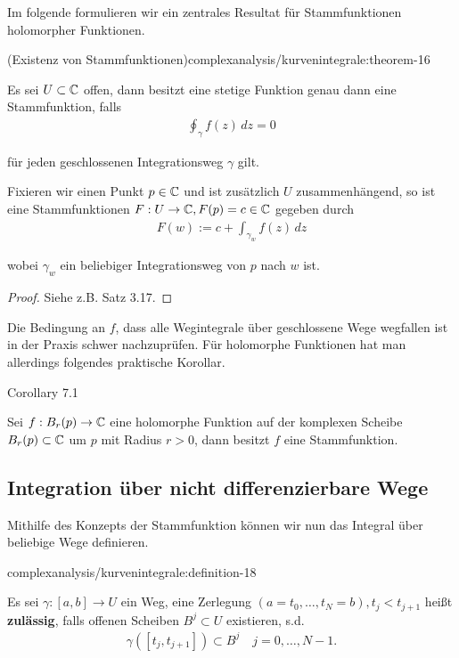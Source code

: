 \par
Im folgende formulieren wir ein zentrales Resultat für Stammfunktionen holomorpher Funktionen.
\begin{theorem}{(Existenz von Stammfunktionen)}{complexanalysis/kurvenintegrale:theorem-16}



\par
Es sei \(U\subset\mathbb{C}\) offen, dann besitzt eine stetige Funktion genau dann eine Stammfunktion, falls
\begin{align*}
\oint_\gamma f(z)\, dz =0
\end{align*}
\par
für jeden geschlossenen Integrationsweg \(\gamma\) gilt.

\par
Fixieren wir einen Punkt \(p\in\mathbb{C}\) und ist zusätzlich \(U\) zusammenhängend, so ist eine Stammfunktionen \(F:U\to\mathbb{C}, F(p)=c\in\mathbb{C}\) gegeben durch
\begin{align*}
F(w):= c+ \int_{\gamma_w} f(z) \,dz
\end{align*}
\par
wobei \(\gamma_w\) ein beliebiger Integrationsweg von \(p\) nach \(w\) ist.
\end{theorem}

\begin{proof}
 Siehe z.B. \cite{Nee17} Satz 3.17.
\end{proof}

\par
Die Bedingung an \(f\), dass alle Wegintegrale über geschlossene Wege wegfallen ist in der Praxis schwer nachzuprüfen. Für holomorphe Funktionen hat man allerdings folgendes praktische Korollar.
\label{complexanalysis/kurvenintegrale:corollary-17}
\begin{emphBox}{}{}{Corollary 7.1}



\par
Sei \(f:B_r(p)\to\mathbb{C}\) eine holomorphe Funktion auf der komplexen Scheibe \(B_r(p)\subset\mathbb{C}\) um \(p\) mit Radius \(r>0\), dann besitzt \(f\) eine Stammfunktion.
\end{emphBox}


\subsection{Integration über nicht differenzierbare Wege}
\label{\detokenize{complexanalysis/kurvenintegrale:integration-uber-nicht-differenzierbare-wege}}
\par
Mithilfe des Konzepts der Stammfunktion können wir nun das Integral über beliebige Wege definieren.
\begin{definition}{}{complexanalysis/kurvenintegrale:definition-18}



\par
Es sei \(\gamma:[a,b]\to U\) ein Weg, eine Zerlegung \((a=t_0,\ldots, t_N=b), t_j<t_{j+1}\) heißt \textbf{zulässig}, falls offenen Scheiben \(B^j\subset U\) existieren, s.d.
\begin{align*}
\gamma([t_j,t_{j+1}])\subset B^j\quad j=0,\ldots,N-1.
\end{align*}\end{definition}

